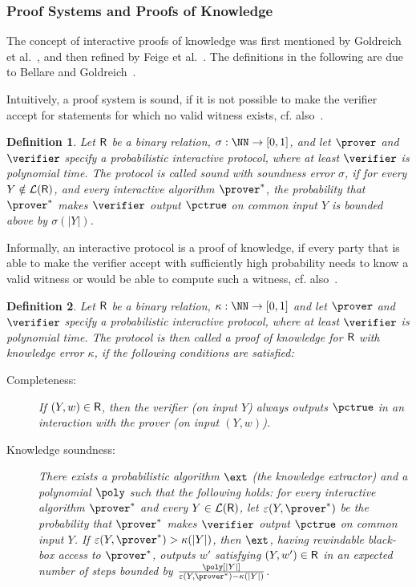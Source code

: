 \documentclass[runningheads,11pt]{article}
\newtheorem{definition}{Definition}
\begin{document}
\subsubsection{Proof Systems and Proofs of Knowledge}

The concept of interactive proofs of knowledge was first mentioned by Goldreich et al.~\cite{STOC:GolMicRac85}, and then refined by Feige et al.~\cite{STOC:FeiFiaSha87}.
The definitions in the following are due to Bellare and Goldreich~\cite{C:BelGol92}.

Intuitively, a proof system is sound, if it is not possible to make the verifier accept for statements for which no valid witness exists, cf. also~\cite[1.6.2]{zkproof-reference}.
\begin{definition}\label{def:soundness}
  Let $\mathsf{R}$ be a binary relation, $\sigma:\NN\to[0,1]$, and let $\prover$ and $\verifier$ specify a probabilistic interactive protocol, where at least $\verifier$ is polynomial time.
  The protocol is called \emph{sound} with \emph{soundness error} $\sigma$, if for every $Y\notin\mathcal{L}(\mathsf{R})$,
  and every interactive algorithm $\prover^*$, the probability that $\prover^*$ makes $\verifier$ output $\accept$ on common input $Y$ is bounded above by $\sigma(|Y|)$.
\end{definition}

Informally, an interactive protocol is a proof of knowledge, if every party that is able to make the verifier accept with sufficiently high probability needs to know a valid witness or would be able to compute such a witness, cf. also~\cite[1.6.3]{zkproof-reference}.
\begin{definition}\label{def:pok}
  Let $\mathsf{R}$ be a binary relation, $\kappa:\NN\to[0,1]$ and let $\prover$ and $\verifier$ specify a probabilistic interactive protocol, where at least $\verifier$ is polynomial time.
  The protocol is then called a \emph{proof of knowledge} for $\mathsf{R}$ with \emph{knowledge error} $\kappa$, if the following conditions are satisfied:
  \begin{description}
    \item[Completeness:]
      If $(Y,w)\in\mathsf{R}$, then the verifier (on input $Y$) always outputs $\accept$ in an interaction with the prover (on input $(Y,w)$).
    \item[Knowledge soundness:]
      There exists a probabilistic algorithm $\ext$ (the \emph{knowledge extractor}) and a polynomial $\poly$ such that the following holds:
      for every interactive algorithm $\prover^*$ and every $Y\in\mathcal{L}(\mathsf{R})$, let $\varepsilon(Y,\prover^*)$ be the probability that $\prover^*$ makes $\verifier$ output $\accept$ on common input $Y$.
      If $\varepsilon(Y,\prover^*)>\kappa(|Y|)$, then $\ext$, having rewindable black-box access to $\prover^*$, outputs $w'$ satisfying $(Y,w')\in\mathsf{R}$ in an expected number of steps bounded by $\frac{\poly[|Y|]}{\varepsilon(Y,\prover^*)-\kappa(|Y|)}$.
  \end{description}
\end{definition}
\end{document}
